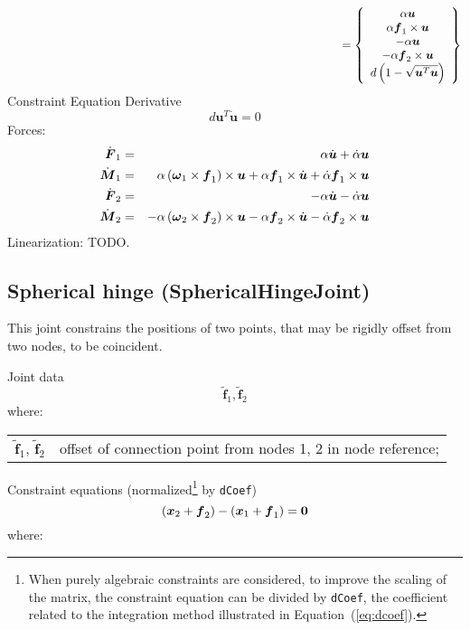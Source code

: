 \documentclass[10pt,dvips,fleqn]{report}
\newcommand{\T}[1]{\boldsymbol{#1}}
\begin{document}
\begin{equation}
	\mbox{\hspace{100mm}} = \cubr{\cvvect{
		\alpha \T{u} \\
		\alpha \T{f}_1\times\T{u} \\
		-\alpha \T{u} \\
		-\alpha \T{f}_2\times\T{u} \\
		d\plbr{1 - \sqrt{\T{u}^T \T{u}}}
	}}
\end{equation}
Constraint Equation Derivative
\begin{equation}
	d \T{u}^T\dot{\T{u}} = 0
\end{equation}
Forces:
\begin{eqnarray}
	\dot{\T{F}}_1 & = &  \alpha \dot{\T{u}} + \dot{\alpha} \T{u} \\
	\dot{\T{M}}_1 & = & \alpha \plbr{\T{\omega}_1\times\T{f}_1} \times \T{u} 
		+ \alpha \T{f}_1 \times \dot{\T{u}}
		+ \dot{\alpha} \T{f}_1 \times \T{u} \\
	\dot{\T{F}}_2 & = & -\alpha \dot{\T{u}} - \dot{\alpha} \T{u} \\
	\dot{\T{M}}_2 & = & -\alpha \plbr{\T{\omega}_2 \times\T{f}_2} \times \T{u}
		- \alpha \T{f}_2 \times \dot{\T{u}}
		- \dot{\alpha} \T{f}_2 \times \T{u}
\end{eqnarray}
Linearization: TODO.





\subsection{Spherical hinge (SphericalHingeJoint)}
This joint constrains the positions of two points, 
that may be rigidly offset from two nodes, to be coincident.

Joint data
\begin{equation}
\tilde{\T{f}}_1, \tilde{\T{f}}_2
\end{equation}
where:

\noindent
\begin{tabular}{ll}
$\tilde{\T{f}}_1$, $\tilde{\T{f}}_2$ & offset of connection point from nodes 1, 2 in node reference; \\
\end{tabular}

\noindent
Constraint equations (normalized\footnote{When purely algebraic
constraints are considered, to improve the scaling of the matrix,
the constraint equation can be divided by \texttt{dCoef},
the coefficient related to the integration method illustrated 
in Equation~(\ref{eq:dcoef}).
} by \texttt{dCoef})
\begin{equation}
	\plbr{\T{x}_2 + \T{f}_2} - \plbr{\T{x}_1 + \T{f}_1} = \T{0}
\end{equation}
where:
\end{document}
